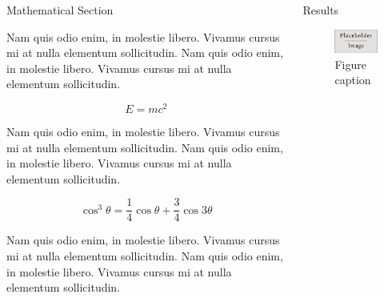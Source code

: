\documentclass[final]{beamer}
\newlength{\onecolwid}
\newlength{\twocolwid}
\begin{document}
\begin{frame}[t]
\begin{columns}[t]
\begin{column}{\twocolwid}
\begin{columns}[t,totalwidth=\twocolwid]
\begin{column}{\onecolwid}

\begin{block}{Mathematical Section}

Nam quis odio enim, in molestie libero. Vivamus cursus mi at nulla elementum sollicitudin. Nam quis odio enim, in molestie libero. Vivamus cursus mi at nulla elementum sollicitudin.
  
\begin{equation}
E = mc^{2}
\label{eqn:Einstein}
\end{equation}

Nam quis odio enim, in molestie libero. Vivamus cursus mi at nulla elementum sollicitudin. Nam quis odio enim, in molestie libero. Vivamus cursus mi at nulla elementum sollicitudin.

\begin{equation}
\cos^3 \theta =\frac{1}{4}\cos\theta+\frac{3}{4}\cos 3\theta
\label{eq:refname}
\end{equation}

Nam quis odio enim, in molestie libero. Vivamus cursus mi at nulla elementum sollicitudin. Nam quis odio enim, in molestie libero. Vivamus cursus mi at nulla elementum sollicitudin.

\end{block}


\end{column} %

\begin{column}{\onecolwid} %


\begin{block}{Results}

\begin{figure}
\includegraphics[width=0.8\linewidth]{source/placeholder.jpg}
\caption{Figure caption}
\end{figure}


\end{block}
\end{column}
\end{columns}
\end{column}
\end{columns}
\end{frame}
\end{document}
